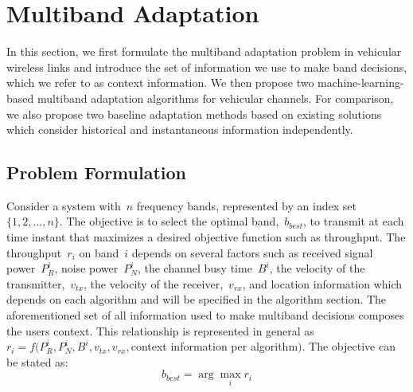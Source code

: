 \section{Multiband Adaptation}
\label{sec:model}
In this section, we first formulate the multiband 
adaptation problem in vehicular wireless links and introduce the set of information we use to make band decisions, which we refer to as context information. We then propose two machine-learning-based 
multiband adaptation algorithms for vehicular channels. For comparison, we also propose two baseline adaptation methods based on existing solutions which consider historical and instantaneous information independently.

\subsection{Problem Formulation}
Consider a system with~$n$ frequency bands, represented by an index set~$\{1,2, \ldots, n\}$. 
The objective is to select the optimal band,~$b_{best}$, to transmit at each time instant that maximizes a desired objective function such as throughput. The throughput~$r_i$ on band~$i$ depends on several factors such as received signal power~$P_R^i$, noise power~$P_N^i$, the channel busy time~$B^i$, the velocity of the transmitter,~$v_{tx}$,
 the velocity of the receiver,~$v_{rx}$, 
 and location information which depends on each algorithm and will be specified in the algorithm section. The aforementioned set of all information used to make multiband decisions composes the users context. 
This relationship is represented in general as~$r_i = f(P_R^i, P_N^i, B^i, v_{tx}, v_{rx}, $context information per algorithm$)$. The objective can be stated as:
\begin{equation}
b_{best}= \arg \max_i r_i 
\end{equation}
